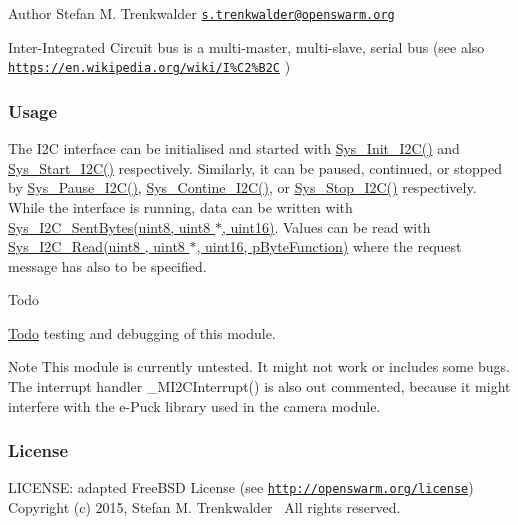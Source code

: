 \begin{DoxyAuthor}{Author}
Stefan M. Trenkwalder \href{mailto:s.trenkwalder@openswarm.org}{\tt s.\+trenkwalder@openswarm.\+org}
\end{DoxyAuthor}
Inter-\/\+Integrated Circuit bus is a multi-\/master, multi-\/slave, serial bus (see also \href{https://en.wikipedia.org/wiki/I%C2%B2C}{\tt https\+://en.\+wikipedia.\+org/wiki/\+I\%\+C2\%\+B2\+C} )\hypertarget{group__i2c_i2c_usage}{}\subsubsection{Usage}\label{group__i2c_i2c_usage}
The I2\+C interface can be initialised and started with \hyperlink{i2c_8h_ae0e15cb80a0603c250857c1a799a62f5}{Sys\+\_\+\+Init\+\_\+\+I2\+C()} and \hyperlink{i2c_8h_a47a8891b8d4ec015d28d2fb38db7af81}{Sys\+\_\+\+Start\+\_\+\+I2\+C()} respectively. Similarly, it can be paused, continued, or stopped by \hyperlink{i2c_8h_a5093f0861938b0821984309c08ed245a}{Sys\+\_\+\+Pause\+\_\+\+I2\+C()}, \hyperlink{i2c_8h_afd7fe98d1cae4221b8541e2f232a1fe8}{Sys\+\_\+\+Contine\+\_\+\+I2\+C()}, or \hyperlink{i2c_8h_a808f963da209bf3a2437be9ac98b3ae3}{Sys\+\_\+\+Stop\+\_\+\+I2\+C()} respectively. While the interface is running, data can be written with \hyperlink{i2c_8h_aae28d108698f25ca0465e1b57d28eaaa}{Sys\+\_\+\+I2\+C\+\_\+\+Sent\+Bytes(uint8, uint8 $\ast$, uint16)}. Values can be read with \hyperlink{i2c_8h_ac368d180152e0f85b5b5f210ad7dc573}{Sys\+\_\+\+I2\+C\+\_\+\+Read(uint8 , uint8 $\ast$, uint16, p\+Byte\+Function)} where the request message has also to be specified.

\begin{DoxyRefDesc}{Todo}
\item[\hyperlink{todo__todo000006}{Todo}]testing and debugging of this module.\end{DoxyRefDesc}


\begin{DoxyNote}{Note}
This module is currently untested. It might not work or includes some bugs. The interrupt handler \+\_\+\+M\+I2\+C\+Interrupt() is also out commented, because it might interfere with the e-\/\+Puck library used in the camera module.
\end{DoxyNote}
\hypertarget{group__i2c_i2c_license}{}\subsubsection{License}\label{group__i2c_i2c_license}
L\+I\+C\+E\+N\+S\+E\+: adapted Free\+B\+S\+D License (see \href{http://openswarm.org/license}{\tt http\+://openswarm.\+org/license})~\newline
Copyright (c) 2015, Stefan M. Trenkwalder~\newline
All rights reserved. 